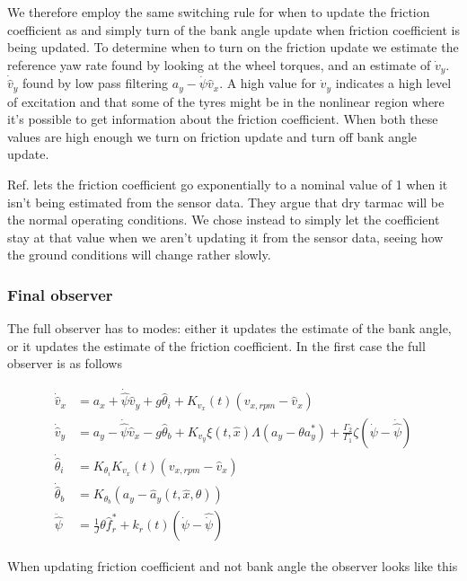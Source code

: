 We therefore employ the same switching rule for when to update the friction coefficient as \cite{MainStateEst} and simply turn of the bank angle update when friction coefficient is being updated. To determine when to turn on the friction update we estimate the reference yaw rate found by looking at the wheel torques, and an estimate of $\dot{v}_y$. $\dot{\hat{v}}_y$ found by low pass filtering $a_y - \dot{\psi}\hat{v}_x$. A high value for $\dot{v}_y$ indicates a high level of excitation and that some of the tyres might be in the nonlinear region where it's possible to get information about the friction coefficient. When both these values are high enough we turn on friction update and turn off bank angle update. 

Ref. \cite{MainStateEst} lets the friction coefficient go exponentially to a nominal value of 1 when it isn't being estimated from the sensor data. They argue that dry tarmac will be the normal operating conditions. We chose instead to simply let the coefficient stay at that value when we aren't updating it from the sensor data, seeing how the ground conditions will change rather slowly.

\subsubsection{Final observer}
The full observer has to modes: either it updates the estimate of the bank angle, or it updates the estimate of the friction coefficient. In the first case the full observer is as follows

\begin{align}
    \dot{\hat{v}}_x & = a_x + \dot{\hat{\psi}}\hat{v}_y + g\hat{\theta}_i + K_{v_x}(t)(v_{x,rpm} - \hat{v}_x) \\
    \dot{\hat{v}}_y & = a_y - \dot{\hat{\psi}}\hat{v}_x - g\hat{\theta}_b + K_{v_y}\xi(t,\hat{x})\Lambda(a_y - \theta a_y^{*}) + \frac{\Gamma_2}{\Gamma_1}\zeta(\dot{\psi} - \dot{\hat{\psi}}) \\ 
    \dot{\hat{\theta}}_i & = K_{\theta_i}K_{v_x}(t)(v_{x,rpm} - \hat{v}_x) \\
    \dot{\hat{\theta}}_b & = K_{\theta_b}(a_y-\hat{a}_y(t,\hat{x},\theta)) \\ 
    \ddot{\hat{\psi}} & = \frac{1}{J}\theta \hat{f}_r^* + k_r(t)(\dot{\psi}-\hat{\dot{\psi}})
\end{align}

When updating friction coefficient and not bank angle the observer looks like this

